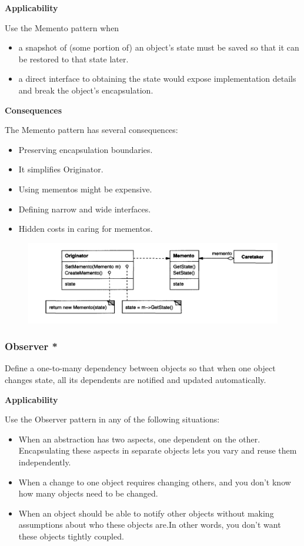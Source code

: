 \documentclass{article}
\begin{document}
\textbf{Applicability}

Use the Memento pattern when

\begin{itemize}
    \item a snapshot of (some portion of) an object's state must be saved so that it can be restored to that state later.
    \item a direct interface to obtaining the state would expose implementation details and break the object's encapsulation.
\end{itemize}

\textbf{Consequences}

The Memento pattern has several consequences:
\begin{itemize}
    \item Preserving encapsulation boundaries.
    \item It simplifies Originator.
    \item Using mementos might be expensive.
    \item Defining narrow and wide interfaces.
    \item Hidden costs in caring for mementos.
\end{itemize}

\begin{figure}[h]
    \centering
    \includegraphics[width=14cm]{diagrams/pattern-18-memento.png}
\end{figure}

\newpage
\subsubsection{Observer *}
Define a one-to-many dependency between objects so that when one object changes state, all its dependents are notified and updated automatically.


\textbf{Applicability}

Use the Observer pattern in any of the following situations:

\begin{itemize}
    \item When an abstraction has two aspects, one dependent on the other. Encapsulating these aspects in separate objects lets you vary and reuse them independently.
    \item When a change to one object requires changing others, and you don't know how many objects need to be changed.
    \item When an object should be able to notify other objects without making assumptions about who these objects are.In other words, you don't want these objects tightly coupled.
\end{itemize}
\end{document}
